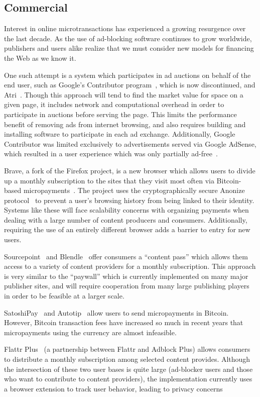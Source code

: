 \subsection{Commercial}
Interest in online microtransactions has experienced a growing resurgence over the last decade.
As the use of ad-blocking software continues to grow worldwide, publishers and users alike realize that we must consider new models for financing the Web as we know it.

One such attempt is a system which participates in ad auctions on behalf of the end user, such as Google's Contributor program~\cite{contributor}, which is now discontinued, and Atri~\cite{atri}.
Though this approach will tend to find the market value for space on a given page, it includes network and computational overhead in order to participate in auctions before serving the page.
This limits the performance benefit of removing ads from internet browsing, and also requires building and installing software to participate in each ad exchange.
Additionally, Google Contributor was limited exclusively to advertisements served via Google AdSense, which resulted in a user experience which was only partially ad-free~\cite{adsense}.

Brave, a fork of the Firefox project, is a new browser which allows users to divide up a monthly subscription to the sites that they visit most often via Bitcoin-based micropayments~\cite{brave}.
The project uses the cryptographically secure Anonize protocol~\cite{anonize} to prevent a user's browsing history from being linked to their identity.
Systems like these will face scalability concerns with organizing payments when dealing with a large number of content producers and consumers.
Additionally, requiring the use of an entirely different browser adds a barrier to entry for new users.

Sourcepoint~\cite{sourcepoint} and Blendle~\cite{blendle} offer consumers a “content pass” which allows them access to a variety of content providers for a monthly subscription.
This approach is very similar to the ``paywall'' which is currently implemented on many major publisher sites, and will require cooperation from many large publishing players in order to be feasible at a larger scale.

SatoshiPay~\cite{satoshi} and Autotip~\cite{autotip} allow users to send micropayments in Bitcoin.
However, Bitcoin transaction fees have increased so much in recent years that micropayments using the currency are almost infeasible.

Flattr Plus~\cite{flattrplus} (a partnership between Flattr and Adblock Plus) allows consumers to distribute a monthly subscription among selected content provides.
Although the intersection of these two user bases is quite large (ad-blocker users and those who want to contribute to content providers), the implementation currently uses a browser extension to track user behavior, leading to privacy concerns

